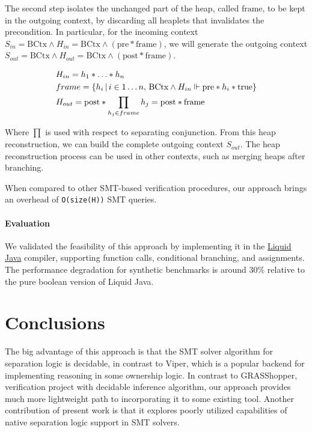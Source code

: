\documentclass[sigplan,screen,review]{acmart}
\begin{document}
The second step isolates the unchanged part of the heap, called $\mbox{frame}$, to be kept in the outgoing context, by discarding all heaplets that invalidates the precondition. In particular, for the incoming context $S_{in} = \mbox{BCtx} \wedge H_{in} = \mbox{BCtx} \wedge (\text{pre} * \text{frame})$, we will generate the outgoing context $S_{out} = \text{BCtx} \wedge H_{out} = \text{BCtx} \wedge (\text{post} * \text{frame})$. 

\begin{align*}
&H_{in} = h_1 \mathbin{*} \dots \mathbin{*} h_n\\
&frame = \* \{ h_i  \,|\, i \in 1\dots n,\, \mbox{BCtx} \wedge H_{in} \Vdash \mbox{pre} \mathbin{*} h_i  \mathbin{*} \text{true} \}\\
&H_{out} = \text{post} \mathbin{*} \prod_{h_j \in frame} h_j = \text{post} \mathbin{*} \text{frame}
\end{align*}

Where $\prod$ is used with respect to separating conjunction. From this heap reconstruction, we can build the complete outgoing context $S_{out}$. The heap reconstruction process can be used in other contexts, such as merging heaps after branching.

When compared to other SMT-based verification procedures, our approach brings an overhead of \texttt{O(size(H))} SMT queries.

\paragraph{Evaluation} We validated the feasibility of this approach by implementing it in the \href{https://catarinagamboa.github.io/liquidjava.html}{Liquid Java} compiler, supporting function calls, conditional branching, and assignments. The performance degradation for synthetic benchmarks is around 30\% relative to the pure boolean version of Liquid Java.


\section{Conclusions}

The big advantage of this approach is that the SMT solver algorithm for separation logic is decidable, in contrast to Viper\cite{DBLP:conf/vmcai/0001SS16}, which is a popular backend for implementing reasoning in some ownership logic. In contrast to GRASShopper\cite{piskac2014grasshopper}, verification project with decidable inference algorithm, our approach provides much more lightweight path to incorporating it to some existing tool. Another contribution of present work is that it explores poorly utilized capabilities of native separation logic support in SMT solvers. 
\end{document}
